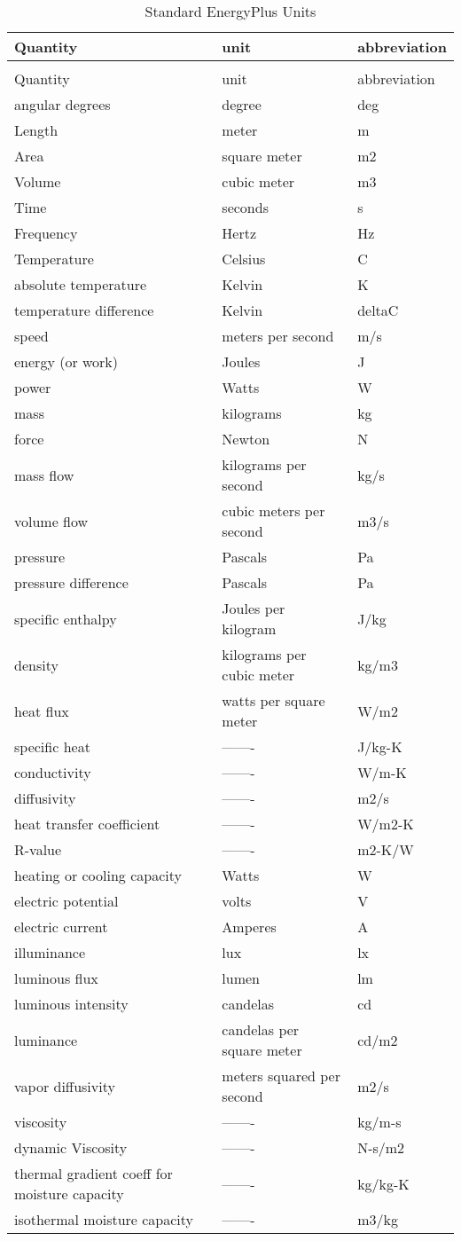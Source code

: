 \begin{longtable}[c]{p{1.59in}p{2.9in}p{1.5in}}
\caption{Standard EnergyPlus Units \label{table:standard-energyplus-units}} \tabularnewline
\toprule
Quantity & unit & abbreviation \tabularnewline
\midrule
\endfirsthead

\caption[]{Standard EnergyPlus Units} \tabularnewline
\toprule
Quantity & unit & abbreviation \tabularnewline
\midrule
\endhead

angular degrees & degree & deg \tabularnewline
Length & meter & m \tabularnewline
Area & square meter & m2 \tabularnewline
Volume & cubic meter & m3 \tabularnewline
Time & seconds & s \tabularnewline
Frequency & Hertz & Hz \tabularnewline
Temperature & Celsius & C \tabularnewline
absolute temperature & Kelvin & K \tabularnewline
temperature difference & Kelvin & deltaC \tabularnewline
speed & meters per second & m/s \tabularnewline
energy (or work) & Joules & J \tabularnewline
power & Watts & W \tabularnewline
mass & kilograms & kg \tabularnewline
force & Newton & N \tabularnewline
mass flow & kilograms per second & kg/s \tabularnewline
volume flow & cubic meters per second & m3/s \tabularnewline
pressure & Pascals & Pa \tabularnewline
pressure difference & Pascals & Pa \tabularnewline
specific enthalpy & Joules per kilogram & J/kg \tabularnewline
density & kilograms per cubic meter & kg/m3 \tabularnewline
heat flux & watts per square meter & W/m2 \tabularnewline
specific heat & ------- & J/kg-K \tabularnewline
conductivity & ------- & W/m-K \tabularnewline
diffusivity & ------- & m2/s \tabularnewline
heat transfer coefficient & ------- & W/m2-K \tabularnewline
R-value & ------- & m2-K/W \tabularnewline
heating or cooling capacity & Watts & W \tabularnewline
electric potential & volts & V \tabularnewline
electric current & Amperes & A \tabularnewline
illuminance & lux & lx \tabularnewline
luminous flux & lumen & lm \tabularnewline
luminous intensity & candelas & cd \tabularnewline
luminance & candelas per square meter & cd/m2 \tabularnewline
vapor diffusivity & meters squared per second & m2/s \tabularnewline
viscosity & ------- & kg/m-s \tabularnewline
dynamic Viscosity & ------- & N-s/m2 \tabularnewline
thermal gradient coeff for moisture capacity & ------- & kg/kg-K \tabularnewline
isothermal moisture capacity & ------- & m3/kg \tabularnewline
\bottomrule
\end{longtable}